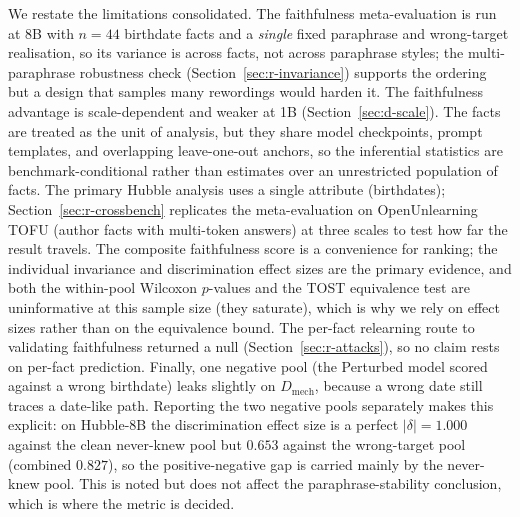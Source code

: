 We restate the limitations consolidated. The faithfulness meta-evaluation is run at 8B with $n=44$
birthdate facts and a \emph{single} fixed paraphrase and wrong-target realisation, so its variance is across
facts, not across paraphrase styles; the multi-paraphrase robustness check
(Section~\ref{sec:r-invariance}) supports the ordering but a design that samples many rewordings would
harden it. The faithfulness advantage is scale-dependent and weaker at 1B (Section~\ref{sec:d-scale}). The
facts are treated as the unit of analysis, but they share model checkpoints, prompt templates, and
overlapping leave-one-out anchors, so the inferential statistics are benchmark-conditional rather than
estimates over an unrestricted population of facts. The primary Hubble analysis uses a single attribute
(birthdates); Section~\ref{sec:r-crossbench} replicates the meta-evaluation on OpenUnlearning TOFU
(author facts with multi-token answers) at three scales to test how far the result travels. The composite
faithfulness score is a convenience for ranking; the individual invariance and discrimination effect sizes
are the primary evidence, and both the within-pool Wilcoxon $p$-values and the TOST equivalence test are
uninformative at this sample size (they saturate), which is why we rely on effect sizes rather than on the
equivalence bound. The per-fact relearning route to
validating faithfulness returned a null (Section~\ref{sec:r-attacks}), so no claim rests on per-fact
prediction. Finally, one negative pool (the Perturbed model scored against a wrong birthdate) leaks slightly
on $D_\text{mech}$, because a wrong date still traces a date-like path. Reporting the two negative pools
separately makes this explicit: on Hubble-8B the discrimination effect size is a perfect $|\delta|=1.000$
against the clean never-knew pool but $0.653$ against the wrong-target pool (combined $0.827$), so the
positive-negative gap is carried mainly by the never-knew pool. This is noted but does not affect the
paraphrase-stability conclusion, which is where the metric is decided.
